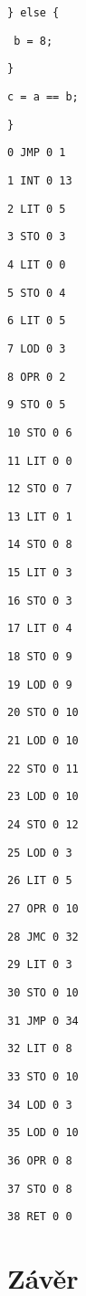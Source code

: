 \documentclass[czech]{thesiskiv}
\begin{document}
\texttt{\} else \{ }

\texttt{    b = 8; }
    
\texttt{\} }

\texttt{c = a == b;}

\texttt{\}}


\texttt{0	JMP	0	1}

\texttt{1	INT	0	13}

\texttt{2	LIT	0	5 }

\texttt{3	STO	0	3 }

\texttt{4	LIT	0	0 }

\texttt{5	STO	0	4 }

\texttt{6	LIT	0	5 }

\texttt{7	LOD	0	3 }

\texttt{8	OPR	0	2 }
                   
\texttt{9	STO	0	5  }

\texttt{10	STO	0	6 }

\texttt{11	LIT	0	0  }

\texttt{12	STO	0	7   }

\texttt{13	LIT	0	1    }

\texttt{14	STO	0	8     }

\texttt{15	LIT	0	3      }

\texttt{16	STO	0	3       }

\texttt{17	LIT	0	4      }

\texttt{18	STO	0	9 }

\texttt{19	LOD	0	9  }

\texttt{20	STO	0	10  }

\texttt{21	LOD	0	10   }

\texttt{22	STO	0	11    }

\texttt{23	LOD	0	10     }

\texttt{24	STO	0	12      }

\texttt{25	LOD	0	3        }

\texttt{26	LIT	0	5 }

\texttt{27	OPR	0	10 }

\texttt{28	JMC	0	32  }

\texttt{29	LIT	0	3    }

\texttt{30	STO	0	10    }

\texttt{31	JMP	0	34     }

\texttt{32	LIT	0	8       }

\texttt{33	STO	0	10       }

\texttt{34	LOD	0	3         }

\texttt{35	LOD	0	10         }

\texttt{36	OPR	0	8           }

\texttt{37	STO	0	8            }

\texttt{38	RET	0	0             }



\chapter{Závěr}
\end{document}

